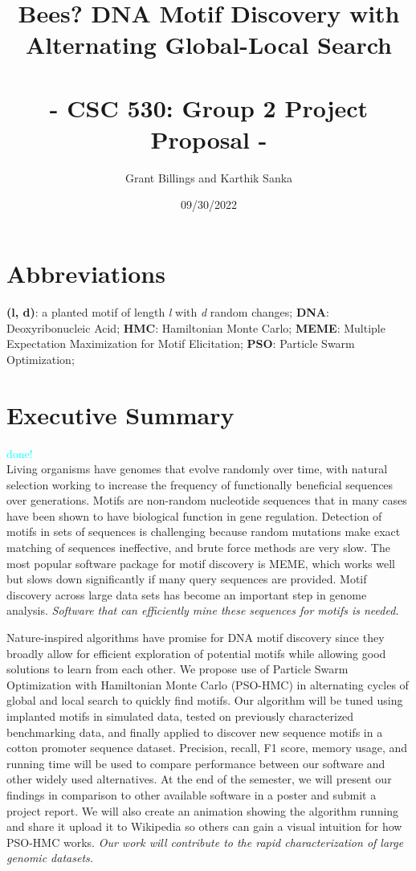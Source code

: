\documentclass{article}
\title{%
	\Large Bees? DNA Motif Discovery with Alternating Global-Local Search  \\
	\large \; \\ - CSC 530: Group 2 Project Proposal -}
\author{Grant Billings and Karthik Sanka}
\date{09/30/2022}
\begin{document}
\maketitle
\section*{\large{Abbreviations}}
\textbf{(l, d)}: a planted motif of length \textit{l} with \textit{d} random changes; \textbf{DNA}: Deoxyribonucleic Acid; \textbf{HMC}: Hamiltonian Monte Carlo; \textbf{MEME}: Multiple Expectation Maximization for Motif Elicitation; \textbf{PSO}: Particle Swarm Optimization;
\section{Executive Summary}
\textcolor{cyan}{done!} \\
Living organisms have genomes that evolve randomly over time, with natural selection working to increase the frequency of functionally beneficial sequences over generations. Motifs are non-random nucleotide sequences that in many cases have been shown to have biological function in gene regulation. Detection of motifs in sets of sequences is challenging because random mutations make exact matching of sequences ineffective, and brute force methods are very slow. The most popular software package for motif discovery is MEME, which works well but slows down significantly if many query sequences are provided. Motif discovery across large data sets has become an important step in genome analysis. \textit{Software that can efficiently mine these sequences for motifs is needed.}  
  
Nature-inspired algorithms have promise for DNA motif discovery since they broadly allow for efficient exploration of potential motifs while allowing good solutions to learn from each other. We propose use of Particle Swarm Optimization with Hamiltonian Monte Carlo (PSO-HMC) in alternating cycles of global and local search to quickly find motifs. Our algorithm will be tuned using implanted motifs in simulated data, tested on previously characterized benchmarking data, and finally applied to discover new sequence motifs in a cotton promoter sequence dataset. Precision, recall, F1 score, memory usage, and running time will be used to compare performance between our software and other widely used alternatives. At the end of the semester, we will present our findings in comparison to other available software in a poster and submit a project report. We will also create an animation showing the algorithm running and share it upload it to Wikipedia so others can gain a visual intuition for how PSO-HMC works. \textit{Our work will contribute to the rapid characterization of large genomic datasets.}
\end{document}
